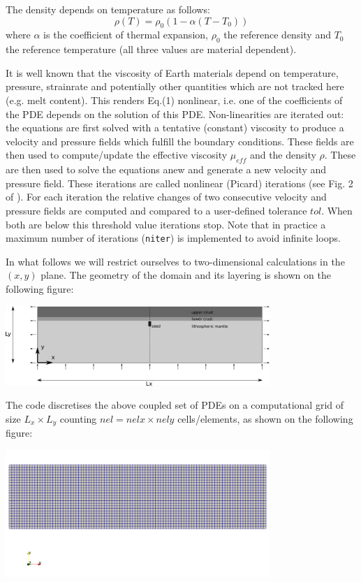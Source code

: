 The density depends on temperature as follows:
\[
\rho(T) = \rho_0 (1-\alpha(T-T_0))
\]
where $\alpha$ is the coefficient of thermal expansion, $\rho_0$ the reference density and $T_0$ the reference temperature
(all three values are material dependent).

It is well known that the viscosity of Earth materials depend on temperature, pressure, strainrate and potentially 
other quantities which are not tracked here (e.g. melt content). This renders Eq.(1) nonlinear, i.e. one of the 
coefficients of the PDE depends on the solution of this PDE. Non-linearities are iterated out: the equations are 
first solved with a tentative (constant) viscosity to produce a velocity and pressure fields which fulfill the 
boundary conditions. These fields are then used to compute/update the effective viscosity $\mu_{eff}$ and the 
density $\rho$. These are then used to solve the equations anew and generate a new velocity and pressure field. 
These iterations are called nonlinear (Picard) iterations (see Fig. 2 of \cite{thie11}). For each iteration the 
relative changes of two consecutive velocity and pressure fields are computed and compared to a user-defined 
tolerance $tol$. When both are below this threshold value iterations stop. Note that in practice a maximum number 
of iterations ({\tt niter}) is implemented to avoid infinite loops.

In what follows we will restrict ourselves to two-dimensional calculations in the $(x,y)$ plane. The geometry of the 
domain and its layering is shown on the following figure:
\begin{center}
\includegraphics[width=10cm]{python_codes/fieldstone_178/images/drawing}
\end{center}
 
The code discretises the above coupled set of PDEs on a computational grid of size $L_x\times L_y$ counting 
$nel=nelx \times nely$ cells/elements, as shown on the following figure:

\begin{center}
\includegraphics[width=10cm]{python_codes/fieldstone_178/images/grid}
\end{center}

